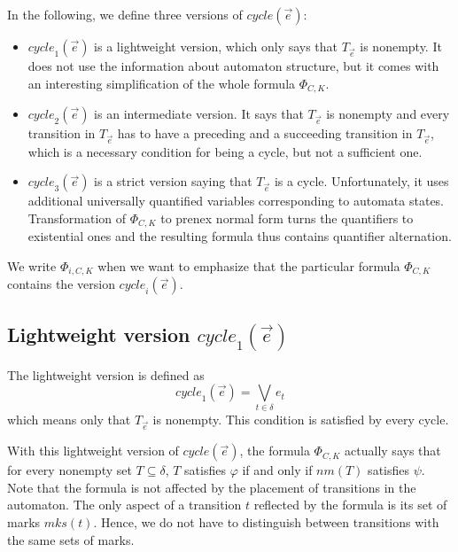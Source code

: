\documentclass[a4paper,UKenglish,cleveref, autoref, thm-restate]{lipics-v2021}
\newcommand{\mks}{\mathit{mks}}
\newcommand{\rem}{\mathit{nm}}
\newcommand{\mcycle}{\mathit{cycle}}
\newcommand{\Te}{T_{\vec{e}}}
\begin{document}
In the following, we define three versions of $\mcycle(\vec{e})$:
\begin{itemize}
\item $\mcycle_1(\vec{e})$ is a lightweight version, which only says
  that $\Te$ is nonempty. It does not use the information about
  automaton structure, but it comes with an interesting simplification
  of the whole formula $\Phi_{C,K}$.
\item $\mcycle_2(\vec{e})$ is an intermediate version. It says that $\Te$
  is nonempty and every transition in $\Te$ has to have a preceding
  and a succeeding transition in $\Te$, which is a necessary condition
  for being a cycle, but not a sufficient one.
\item $\mcycle_3(\vec{e})$ is a strict version saying that $\Te$ is a
  cycle. Unfortunately, it uses additional universally quantified
  variables corresponding to automata states. Transformation of
  $\Phi_{C,K}$ to prenex normal form turns the quantifiers to
  existential ones and the resulting formula thus contains quantifier
  alternation.
\end{itemize}
We write $\Phi_{i,C,K}$ when we want to emphasize that the particular
formula $\Phi_{C,K}$ contains the version $\mcycle_i(\vec{e})$.

\subsection{Lightweight version $\mcycle_1(\vec{e})$}
The lightweight version is defined as
\[
  \mcycle_1(\vec{e})=\bigvee_{t\in\delta}e_t
\]
which means only that $\Te$ is nonempty. This condition is satisfied by
every cycle.

With this lightweight version of $\mcycle(\vec{e})$, the formula
$\Phi_{C,K}$ actually says that
for every nonempty set
$T\subseteq\delta$, $T$ satisfies $\varphi$ if and only if $\rem(T)$ satisfies
$\psi$. Note that the formula is not affected by the placement of
transitions in the automaton. The only aspect of a transition $t$
reflected by the formula is its set of marks $\mks(t)$. Hence, we do
not have to distinguish between transitions with the same sets of
marks. 
\end{document}
